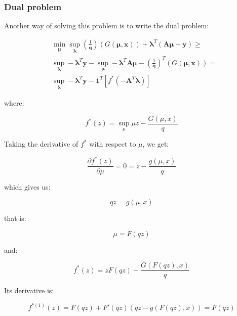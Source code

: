 \documentclass{tex/note}
\begin{document}
\subsubsection{Dual problem}

Another way of solving this problem is to write the dual problem:

\begin{align*}
& \min_{\bm{\mu}} \sup_{\bm{\lambda}} \left( \frac{1}{\bm{q}} \right) \left( G \left( \bm{\mu} , \bm{x} \right) \right) + \bm{\lambda}^T \left( \bm{A} \bm{\mu} - \bm{y} \right) \geq \\
& \sup_{\bm{\lambda}} - \bm{\lambda}^T \bm{y} - \sup_{\bm{\mu}} - \bm{\lambda}^T \bm{A} \bm{\mu} - \left( \frac{1}{\bm{q}} \right)^T \left( G \left( \bm{\mu} , \bm{x} \right) \right) = \\
& \sup_{\bm{\lambda}} - \bm{\lambda}^T \bm{y} -  \bm{1}^T \left[ f^* \left( - \bm{A}^T \bm{\lambda} \right) \right]
\end{align*}

where:

\begin{equation*}
f^* \left( z \right) = \sup_{\mu} \mu z - \frac{G \left( \mu , x \right)}{q}
\end{equation*}

Taking the derivative of $f^*$ with respect to $\mu$, we get:

\begin{equation*}
\frac{\partial f^* \left( z \right)}{\partial \mu} = 0 = z - \frac{g \left( \mu , x \right)}{q}
\end{equation*}

which gives us:

\begin{equation*}
q z = g \left( \mu , x \right)
\end{equation*}

that is:

\begin{equation*}
\mu = F \left( q z \right)
\end{equation*}

and:

\begin{equation*}
f^* \left( z \right) = z F \left( q z \right) - \frac{G \left( F \left( q z \right) , x \right)}{q}
\end{equation*}

Its derivative is:

\begin{equation*}
f^{* \left( 1 \right)} \left( z \right) = F \left( q z \right) + F' \left( q z \right) \left( q z - g \left( F \left( q z \right) , x \right) \right) = F \left( q z \right)
\end{equation*}
\end{document}

